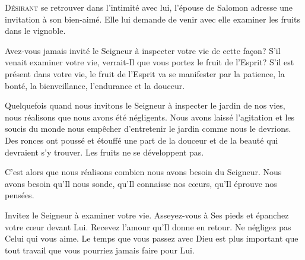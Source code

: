




\lettrine{D}{ésirant} se retrouver dans l'intimité avec lui,
 l'épouse de Salomon adresse une invitation à son bien-aimé.
 Elle lui demande de venir avec elle examiner les fruits dans le vignoble.

Avez-vous jamais invité le Seigneur à inspecter votre vie de cette fa\c{c}on?
 S'il venait examiner votre vie, verrait-Il que vous portez
 le fruit de l'Esprit? S'il est présent dans votre vie,
 le fruit de l'Esprit va se manifester par la patience, la bonté,
 la bienveillance, l'endurance et la douceur.


Quelquefois quand nous invitons le Seigneur à inspecter le jardin de nos vies,
 nous réalisons que nous avons été négligents.
 Nous avons laissé l'agitation et les soucis du monde nous empêcher
 d'entretenir le jardin comme nous le devrions.
 Des ronces ont poussé et étouffé une part de la douceur et de la beauté
 qui devraient s'y trouver. Les fruits ne se développent pas.

C'est alors que nous réalisons combien nous avons besoin du Seigneur.
 Nous avons besoin qu'Il nous sonde, qu'Il connaisse nos c\oe{}urs,
 qu'Il éprouve nos pensées.

Invitez le Seigneur à examiner votre vie. Asseyez-vous à Ses pieds
 et épanchez votre c\oe{}ur devant Lui.
 Recevez l'amour qu'Il donne en retour. Ne négligez pas Celui qui vous aime.
 Le temps que vous passez avec Dieu est plus important
 que tout travail que vous pourriez jamais faire pour Lui.

